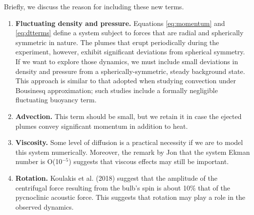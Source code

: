 Briefly, we discuss the reason for including these new terms.
\begin{enumerate}
\item {\bf Fluctuating density and pressure.}   Equations \ref{eq:momentum} and \ref{eq:dtterms} define a system subject to forces that are radial and spherically symmetric in nature.  The plumes that erupt periodically during the experiment, however, exhibit significant deviations from spherical symmetry.  If we want to explore those dynamics, we must include small deviations in density and pressure from a spherically-symmetric, steady background state.  This approach is similar to that adopted when studying convection under Bousinesq approximation; such studies include a formally negligible fluctuating buoyancy term.  
\item {\bf Advection. }  This term should be small, but we retain it in case the ejected plumes convey significant momentum in addition to heat. 
\item {\bf Viscosity. }  Some level of diffusion is a practical necessity if we are to model this system numerically.  Moreover, the remark by Jon that the system Ekman number is O(10$^{-5}$) suggests that viscous effects may still be important.
\item {\bf Rotation. }  Koulakis et al. (2018) suggest that the amplitude of the centrifugal force resulting from the bulb's spin is about 10\% that of the pycnoclinic acoustic force.   This suggests that rotation may play a role in the observed dynamics.
\end{enumerate}



